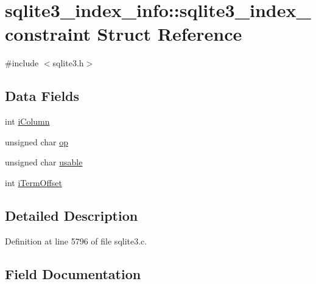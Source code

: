\hypertarget{structsqlite3__index__info_1_1sqlite3__index__constraint}{}\section{sqlite3\+\_\+index\+\_\+info\+:\+:sqlite3\+\_\+index\+\_\+constraint Struct Reference}
\label{structsqlite3__index__info_1_1sqlite3__index__constraint}


{\ttfamily \#include $<$sqlite3.\+h$>$}

\subsection*{Data Fields}
\begin{DoxyCompactItemize}
\item 
int \hyperlink{structsqlite3__index__info_1_1sqlite3__index__constraint_a64afc1df38f1cd02b956e9dd963c0b97}{i\+Column}
\item 
unsigned char \hyperlink{structsqlite3__index__info_1_1sqlite3__index__constraint_a6ead9d3dc9996f54a7248ea8a2d0bdb7}{op}
\item 
unsigned char \hyperlink{structsqlite3__index__info_1_1sqlite3__index__constraint_a2cd12922598daeddd0423ba5584d2963}{usable}
\item 
int \hyperlink{structsqlite3__index__info_1_1sqlite3__index__constraint_ad4e37755bdeacac9de989cdf27415e48}{i\+Term\+Offset}
\end{DoxyCompactItemize}


\subsection{Detailed Description}


Definition at line 5796 of file sqlite3.\+c.



\subsection{Field Documentation}
\hypertarget{structsqlite3__index__info_1_1sqlite3__index__constraint_a64afc1df38f1cd02b956e9dd963c0b97}{}
